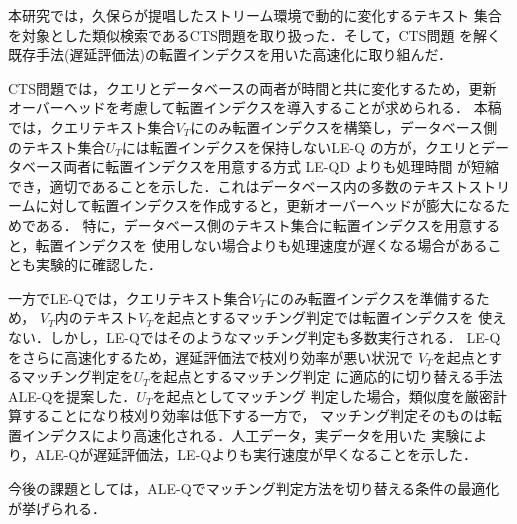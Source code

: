 本研究では，久保ら\cite{kubo}が提唱したストリーム環境で動的に変化するテキスト
集合を対象とした類似検索であるCTS問題を取り扱った．そして，CTS問題
を解く既存手法(遅延評価法)の転置インデクスを用いた高速化に取り組んだ．

CTS問題では，クエリとデータベースの両者が時間と共に変化するため，更新
オーバーヘッドを考慮して転置インデクスを導入することが求められる．
本稿では，クエリテキスト集合$V_T$にのみ転置インデクスを構築し，データベース側
のテキスト集合$U_T$には転置インデクスを保持しないLE-Q
の方が，クエリとデータベース両者に転置インデクスを用意する方式 LE-QD よりも処理時間
が短縮でき，適切であることを示した．これはデータベース内の多数のテキストストリ
ームに対して転置インデクスを作成すると，更新オーバーヘッドが膨大になるためである．
特に，データベース側のテキスト集合に転置インデクスを用意すると，転置インデクスを
使用しない場合よりも処理速度が遅くなる場合があることも実験的に確認した．

一方でLE-Qでは，クエリテキスト集合$V_T$にのみ転置インデクスを準備するため，
$V_T$内のテキスト$V_T$を起点とするマッチング判定では転置インデクスを
使えない．しかし，LE-Qではそのようなマッチング判定も多数実行される．
LE-Qをさらに高速化するため，遅延評価法で枝刈り効率が悪い状況で
$V_T$を起点とするマッチング判定を$U_T$を起点とするマッチング判定
に適応的に切り替える手法 ALE-Qを提案した．$U_T$を起点としてマッチング
判定した場合，類似度を厳密計算することになり枝刈り効率は低下する一方で，
マッチング判定そのものは転置インデクスにより高速化される．人工データ，実データを用いた
実験により，ALE-Qが遅延評価法，LE-Qよりも実行速度が早くなることを示した．

今後の課題としては，ALE-Qでマッチング判定方法を切り替える条件の最適化が挙げられる．

